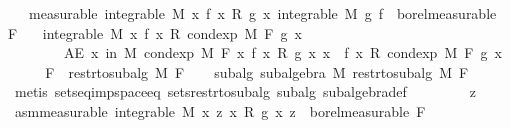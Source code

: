 \begin{isabellebody}
\ \ \ {\isacharbrackleft}{\kern0pt}measurable{\isacharbrackright}{\kern0pt}{\isacharcolon}{\kern0pt}\ {\isachardoublequoteopen}integrable\ M\ {\isacharparenleft}{\kern0pt}{\isasymlambda}x{\isachardot}{\kern0pt}\ f\ x\ {\isacharasterisk}{\kern0pt}\isactrlsub R\ g\ x{\isacharparenright}{\kern0pt}{\isachardoublequoteclose}\ {\isachardoublequoteopen}integrable\ M\ g{\isachardoublequoteclose}\ {\isachardoublequoteopen}f\ {\isasymin}\ borel{\isacharunderscore}{\kern0pt}measurable\ F{\isachardoublequoteclose}\isanewline
\ \ \ {\isachardoublequoteopen}integrable\ M\ {\isacharparenleft}{\kern0pt}{\isasymlambda}x{\isachardot}{\kern0pt}\ f\ x\ {\isacharasterisk}{\kern0pt}\isactrlsub R\ cond{\isacharunderscore}{\kern0pt}exp\ M\ F\ g\ x{\isacharparenright}{\kern0pt}{\isachardoublequoteclose}\isanewline
\ \ \ \ \ \ \ \ {\isachardoublequoteopen}AE\ x\ in\ M{\isachardot}{\kern0pt}\ cond{\isacharunderscore}{\kern0pt}exp\ M\ F\ {\isacharparenleft}{\kern0pt}{\isasymlambda}x{\isachardot}{\kern0pt}\ f\ x\ {\isacharasterisk}{\kern0pt}\isactrlsub R\ g\ x{\isacharparenright}{\kern0pt}\ x\ {\isacharequal}{\kern0pt}\ f\ x\ {\isacharasterisk}{\kern0pt}\isactrlsub R\ cond{\isacharunderscore}{\kern0pt}exp\ M\ F\ g\ x{\isachardoublequoteclose}\isanewline
%
\isadelimproof
%
\endisadelimproof
%
\isatagproof
{}\isamarkupfalse%
\ {\isacharminus}{\kern0pt}\isanewline
\ \ \isamarkupfalse%
\ {\isacharquery}{\kern0pt}F\ {\isacharequal}{\kern0pt}\ {\isachardoublequoteopen}restr{\isacharunderscore}{\kern0pt}to{\isacharunderscore}{\kern0pt}subalg\ M\ F{\isachardoublequoteclose}\isanewline
\ \ \isamarkupfalse%
\ subalg{\isacharprime}{\kern0pt}{\isacharcolon}{\kern0pt}\ {\isachardoublequoteopen}subalgebra\ M\ {\isacharparenleft}{\kern0pt}restr{\isacharunderscore}{\kern0pt}to{\isacharunderscore}{\kern0pt}subalg\ M\ F{\isacharparenright}{\kern0pt}{\isachardoublequoteclose}\ \isamarkupfalse%
\ {\isacharparenleft}{\kern0pt}metis\ sets{\isacharunderscore}{\kern0pt}eq{\isacharunderscore}{\kern0pt}imp{\isacharunderscore}{\kern0pt}space{\isacharunderscore}{\kern0pt}eq\ sets{\isacharunderscore}{\kern0pt}restr{\isacharunderscore}{\kern0pt}to{\isacharunderscore}{\kern0pt}subalg\ subalg\ subalgebra{\isacharunderscore}{\kern0pt}def{\isacharparenright}{\kern0pt}\isanewline
\ \ \isacommand{{\isacharbraceleft}{\kern0pt}}\isamarkupfalse%
\isanewline
\ \ \ \ \isamarkupfalse%
\ z\ \isamarkupfalse%
\ asm{\isacharbrackleft}{\kern0pt}measurable{\isacharbrackright}{\kern0pt}{\isacharcolon}{\kern0pt}\ {\isachardoublequoteopen}integrable\ M\ {\isacharparenleft}{\kern0pt}{\isasymlambda}x{\isachardot}{\kern0pt}\ z\ x\ {\isacharasterisk}{\kern0pt}\isactrlsub R\ g\ x{\isacharparenright}{\kern0pt}{\isachardoublequoteclose}\ {\isachardoublequoteopen}z\ {\isasymin}\ borel{\isacharunderscore}{\kern0pt}measurable\ {\isacharquery}{\kern0pt}F{\isachardoublequoteclose}\isanewline

\end{isabellebody}
